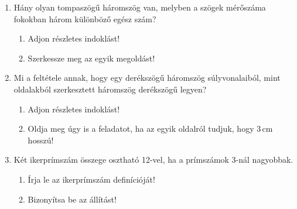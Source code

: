 \documentclass[a4paper,12pt]{article}
\begin{document}
\begin{enumerate}
\item Hány olyan tompaszögű háromszög van, melyben a szögek mérőszáma
fokokban három különböző egész szám?
\begin{enumerate}
\item Adjon részletes indoklást!
\item Szerkessze meg az egyik megoldást!
\end{enumerate}
\item Mi a feltétele annak, hogy egy derékszögű háromszög
súlyvonalaiból, mint oldalakból szerkesztett háromszög derékszögű
legyen?
\begin{enumerate}
\item Adjon részletes indoklást!
\item Oldja meg úgy is a feladatot, ha az egyik oldalról tudjuk,
hogy 3\,cm hosszú!
\end{enumerate}
\item Két ikerprímszám összege osztható 12-vel, ha a prímszámok 3-nál
nagyobbak.
\begin{enumerate}
\item Írja le az ikerprímszám definícióját!
\item Bizonyítsa be az állítást!
\end{enumerate}
\end{enumerate}
\end{document}
